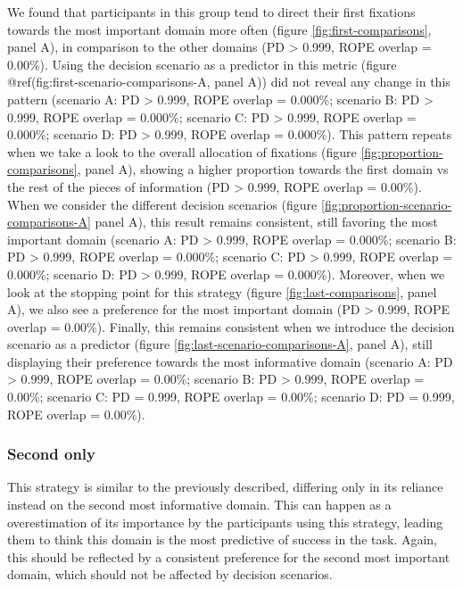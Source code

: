 \documentclass[
  english,
  man]{apa6}
\begin{document}
We found that participants in this group tend to direct their first fixations towards the most important domain more often (figure \ref{fig:first-comparisons}, panel A), in comparison to the other domains (PD \textgreater{} 0.999, ROPE overlap = 0.00\%). Using the decision scenario as a predictor in this metric (figure @ref(fig:first-scenario-comparisons-A, panel A)) did not reveal any change in this pattern (scenario A: PD \textgreater{} 0.999, ROPE overlap = 0.000\%; scenario B: PD \textgreater{} 0.999, ROPE overlap = 0.000\%; scenario C: PD \textgreater{} 0.999, ROPE overlap = 0.000\%; scenario D: PD \textgreater{} 0.999, ROPE overlap = 0.000\%). This pattern repeats when we take a look to the overall allocation of fixations (figure \ref{fig:proportion-comparisons}, panel A), showing a higher proportion towards the first domain vs the rest of the pieces of information (PD \textgreater{} 0.999, ROPE overlap = 0.00\%). When we consider the different decision scenarios (figure \ref{fig:proportion-scenario-comparisons-A} panel A), this result remains consistent, still favoring the most important domain (scenario A: PD \textgreater{} 0.999, ROPE overlap = 0.000\%; scenario B: PD \textgreater{} 0.999, ROPE overlap = 0.000\%; scenario C: PD \textgreater{} 0.999, ROPE overlap = 0.000\%; scenario D: PD \textgreater{} 0.999, ROPE overlap = 0.000\%). Moreover, when we look at the stopping point for this strategy (figure \ref{fig:last-comparisons}, panel A), we also see a preference for the most important domain (PD \textgreater{} 0.999, ROPE overlap = 0.00\%). Finally, this remains consistent when we introduce the decision scenario as a predictor (figure \ref{fig:last-scenario-comparisons-A}, panel A), still displaying their preference towards the most informative domain (scenario A: PD \textgreater{} 0.999, ROPE overlap = 0.00\%; scenario B: PD \textgreater{} 0.999, ROPE overlap = 0.00\%; scenario C: PD = 0.999, ROPE overlap = 0.00\%; scenario D: PD = 0.999, ROPE overlap = 0.00\%).

\hypertarget{second-only}{%
\subsubsection{Second only}\label{second-only}}

This strategy is similar to the previously described, differing only in its reliance instead on the second most informative domain. This can happen as a overestimation of its importance by the participants using this strategy, leading them to think this domain is the most predictive of success in the task. Again, this should be reflected by a consistent preference for the second most important domain, which should not be affected by decision scenarios.
\end{document}
